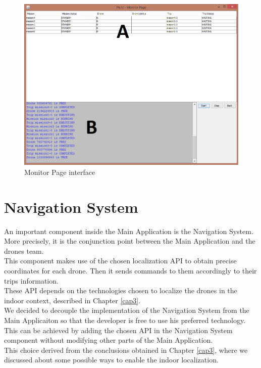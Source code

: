 \begin{figure}[H]
  \centering
  \includegraphics[width=\linewidth]{pictures/MonitorPage.png}
  \caption{Monitor Page interface}
  \label{fig:MonitorPage}
\end{figure}

\section{Navigation System}\label{navigationSystem}

An important component inside the Main Application is the Navigation System. More precisely, it is the conjunction point between the Main Application and the drones team. 
\\
This component makes use of the chosen localization API to obtain precise coordinates for each drone. Then it sends commands to them accordingly to their trips information.
\\
These API depends on the technologies chosen to localize the drones in the indoor context, described in Chapter \ref{cap3}.
\\ 

We decided to decouple the implementation of the Navigation System from the Main Applicaiton so that the developer is free to use his preferred technology. This can be achieved by adding the chosen API in the Navigation System component without modifying other parts of the Main Application.
\\
This choice derived from the conclusions obtained in Chapter \ref{cap3}, where we discussed about some possible ways to enable the indoor localization.
\\

